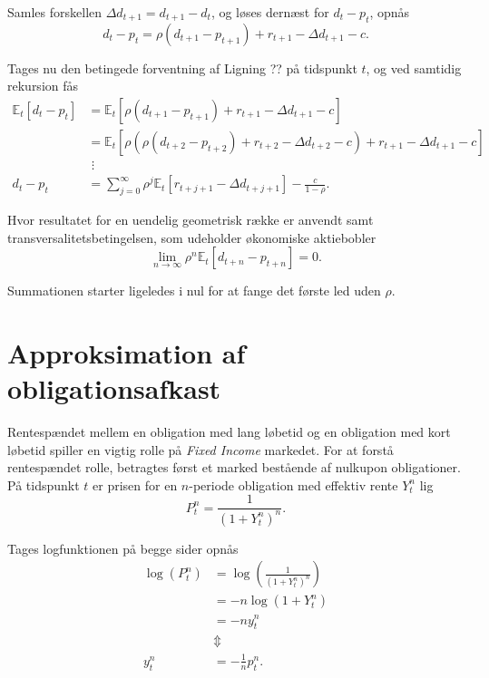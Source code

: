 \documentclass[
  a4paper,
  oneside]{memoir}
\begin{document}
Samles forskellen \(\Delta d_{t+1}=d_{t+1}-d_t\), og løses dernæst for \(d_t-p_t\), opnås
\begin{equation}
d_t-p_t=\rho (d_{t+1}-p_{t+1})+r_{t+1}-\Delta d_{t+1}-c.
\end{equation}

Tages nu den betingede forventning af Ligning ?? på tidspunkt \(t\), og ved samtidig rekursion fås
\begin{align}
\mathbb{E}_t[d_t-p_t]&=\mathbb{E}_t[\rho(d_{t+1}-p_{t+1}) + r_{t+1} -\Delta d_{t+1}-c]\\
&=\mathbb{E}_t[\rho(\rho(d_{t+2}-p_{t+2}) + r_{t+2} -\Delta d_{t+2}-c) + r_{t+1} -\Delta d_{t+1} - c]\\
&\,\,\vdots\\
d_t-p_t&=\sum_{j=0}^\infty \rho^j \mathbb{E}_t[r_{t+j+1}-\Delta d_{t+j+1}] - \frac{c}{1-\rho}.
\end{align}

Hvor resultatet for en uendelig geometrisk række er anvendt samt transversalitetsbetingelsen, som udeholder økonomiske aktiebobler
\[\lim_{n\to\infty} \rho^n \mathbb{E}_t[d_{t+n} - p_{t+n}]=0.\]

Summationen starter ligeledes i nul for at fange det første led uden \(\rho\).

\hypertarget{approksimation-af-obligationsafkast}{%
\section{Approksimation af obligationsafkast}\label{approksimation-af-obligationsafkast}}

Rentespændet mellem en obligation med lang løbetid og en obligation med kort løbetid spiller en vigtig rolle på \emph{Fixed Income} markedet. For at forstå rentespændet rolle, betragtes først et marked bestående af nulkupon obligationer. På tidspunkt \(t\) er prisen for en \(n\)-periode obligation med effektiv rente \(Y_t^n\) lig
\begin{equation}
P_t^n=\frac{1}{\left(1+Y_t^n\right)^n}.
\end{equation}

Tages logfunktionen på begge sider opnås
\begin{align}
\log\left(P_t^n\right)&=\log\left(\frac{1}{\left(1+Y_t^n\right)^n}\right)\\
&=-n\log\left(1+Y_t^n\right)\\
&=-n y_t^n\\
&\Updownarrow\\
y_t^n&=-\frac{1}{n}p_t^n.
\end{align}
\end{document}
